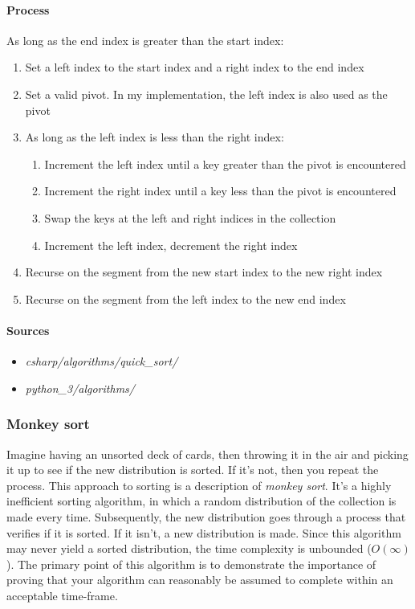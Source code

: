 \documentclass{article}
\begin{document}
\paragraph{Process}
As long as the end index is greater than the start index:
\begin{enumerate}
\item{Set a left index to the start index and a right index to the end index}
\item{Set a valid pivot. In my implementation, the left index is also used as the pivot}
\item{As long as the left index is less than the right index:}
  \begin{enumerate}
  \item{Increment the left index until a key greater than the pivot is encountered}
  \item{Increment the right index until a key less than the pivot is encountered}
  \item{Swap the keys at the left and right indices in the collection}
  \item{Increment the left index, decrement the right index}
  \end{enumerate}
\item{Recurse on the segment from the new start index to the new right index}
\item{Recurse on the segment from the left index to the new end index}
\end{enumerate}

\begin{samepage}
  \paragraph{Sources}
  \begin{itemize}
  \item{{\em csharp/algorithms/quick\_sort/}}
  \item{{\em python\_3/algorithms/}}
  \end{itemize}
\end{samepage}

\subsubsection{Monkey sort}
Imagine having an unsorted deck of cards, then throwing it in the air and picking it up to see if the new
distribution is sorted. If it's not, then you repeat the process. This approach to sorting is a description of
{\em monkey sort}. It's a highly inefficient sorting algorithm, in which a random distribution of the collection
is made every time. Subsequently, the new distribution goes through a process that verifies if it is sorted.
If it isn't, a new distribution is made. Since this algorithm may never yield a sorted distribution, the time
complexity is unbounded (\(O(\infty)\)). The primary point of this algorithm is to demonstrate the importance of
proving that your algorithm can reasonably be assumed to complete within an acceptable time-frame.
\end{document}
